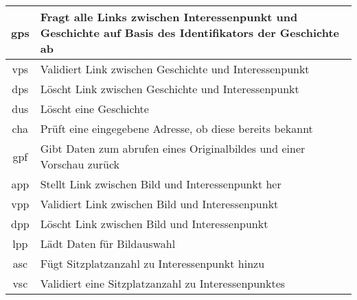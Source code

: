 \begin{longtable}[H]{|c|p{12cm}|}
		gps                 & Fragt alle Links zwischen Interessenpunkt und Geschichte auf Basis des Identifikators der Geschichte ab                                            \\ \hline
		vps                 & Validiert Link zwischen Geschichte und Interessenpunkt                                                                                             \\ \hline
		dps                 & Löscht Link zwischen Geschichte und Interessenpunkt                                                                                                \\ \hline
		dus                 & Löscht eine Geschichte                                                                                                                             \\ \hline
		cha                 & Prüft eine eingegebene Adresse, ob diese bereits bekannt                                                                                           \\ \hline
		gpf                 & Gibt Daten zum abrufen eines Originalbildes und einer Vorschau zurück                                                                              \\ \hline
		app                 & Stellt Link zwischen Bild und Interessenpunkt her                                                                                                  \\ \hline
		vpp                 & Validiert Link zwischen Bild und Interessenpunkt                                                                                                   \\ \hline
		dpp                 & Löscht Link zwischen Bild und Interessenpunkt                                                                                                      \\ \hline
		lpp                 & Lädt Daten für Bildauswahl                                                                                                                         \\ \hline
		asc                 & Fügt Sitzplatzanzahl zu Interessenpunkt hinzu                                                                                                      \\ \hline
		vsc                 & Validiert eine Sitzplatzanzahl zu Interessenpunktes                                                                                                \\ \hline

\end{longtable}
